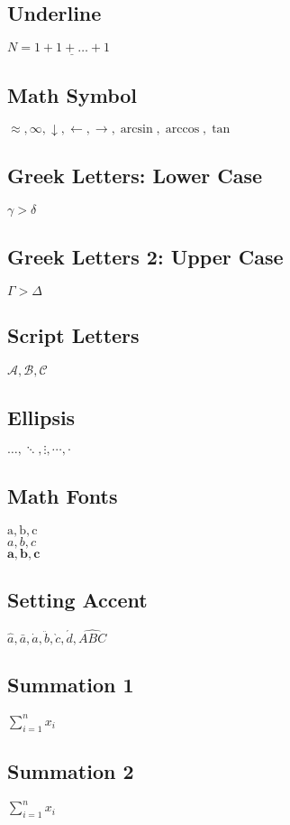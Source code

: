 \subsection{Underline}
$N = \underline{1+1+\ldots+1}$

\subsection{Math Symbol}
$\approx, \infty,  \downarrow, \leftarrow, \rightarrow, \arcsin, \arccos, \tan$

\subsection{Greek Letters: Lower Case}
$\gamma > \delta$

\subsection{Greek Letters 2: Upper Case}
$\Gamma > \Delta$

\subsection{Script Letters}
$\mathcal{A}, \mathcal{B}, \mathcal{C}$

\subsection{Ellipsis}
$\ldots, \ddots, \vdots, \cdots, \cdot$

\subsection{Math Fonts}
$\mathrm{a, b, c}$ \\
$\mathit{a,b,c}$     \\
$\mathbf{a,b,c}$

\subsection{Setting Accent}
$\hat{a}, \bar{a}, \dot{a}, \ddot{b}, \grave{c}, \acute{d}, \widehat{ABC}$


\subsection{Summation 1}
$\sum_{i=1}^n{x_i}$

\subsection{Summation 2}
$\displaystyle{\sum_{i=1}^n{x_i}}$

